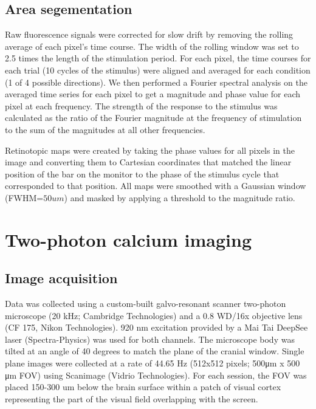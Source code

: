 \subsection{Area segementation}
Raw fluorescence signals were corrected for slow drift by removing the rolling average of each pixel’s time course. The width of the rolling window was set to 2.5 times the length of the stimulation period. For each pixel, the time courses for each trial (10 cycles of the stimulus) were aligned and averaged for each condition (1 of 4 possible directions). We then performed a Fourier spectral analysis on the averaged time series for each pixel to get a magnitude and phase value for each pixel at each frequency. The strength of the response to the stimulus was calculated as the ratio of the Fourier magnitude at the frequency of stimulation to the sum of the magnitudes at all other frequencies\cite{Kalatsky2003, Marshel2011, Juavinet2017}.

Retinotopic maps were created by taking the phase values for all pixels in the image and converting them to Cartesian coordinates that matched the linear position of the bar on the monitor to the phase of the stimulus cycle that corresponded to that position. All maps were smoothed with a Gaussian window (FWHM=$50um$) and masked by applying a threshold to the magnitude ratio.  

\section{Two-photon calcium imaging}
\subsection{Image acquisition}
Data was collected using a custom-built galvo-resonant scanner two-photon microscope (20 kHz; Cambridge Technologies) and a 0.8 WD/16x objective lens (CF 175, Nikon Technologies). 920 nm excitation provided by a Mai Tai DeepSee laser (Spectra-Physics) was used for both channels. The microscope body was tilted at an angle of 40 degrees to match the plane of the cranial window. Single plane images were collected at a rate of 44.65 Hz (512x512 pixels; 500μm x 500 μm FOV) using Scanimage (Vidrio Technologies). For each session, the FOV was placed
150-300 um below the brain surface within a patch of visual cortex representing the part of the
visual field overlapping with the screen.


